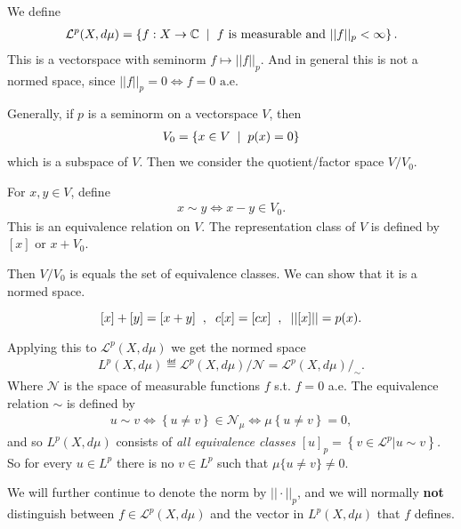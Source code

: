 \begin{definition}
    We define
    \begin{align*}
        \mathcal L^p(X,d\mu) = \left\{ f:X\rightarrow \mathbb{C}\hspace{2mm} |\hspace{2mm} f\text{ is measurable and } ||f||_p<\infty \right\}. 
    \end{align*}
    This is a vectorspace with seminorm $f\mapsto ||f||_p.$
     And in general this is not a normed space, since $||f||_p=0 \iff f=0 \text{ a.e.}$
\end{definition}

Generally, if $p$ is a seminorm on a vectorspace $V$, then
 \begin{align}
    V_0 = \left\{x\in V\hspace{2mm}|\hspace{2mm} p(x)=0 \right\}
\end{align}
which is a subspace of $V$. Then we consider the quotient/factor space $V/V_0.$

\begin{definition}
    For $x,y\in V$, define \begin{align}
        x\sim y \iff x-y\in V_0.
    \end{align}
    This is an equivalence relation on $V$. The representation class of $V$ is defined by $[x]$ or $x+V_0$.
\end{definition}

Then $V/V_0$ is equals the set of equivalence classes. We can show that it is a normed space. 

$$[x]+[y]=[x+y]\hspace{2mm},\hspace{2mm} c[x]=[cx]\hspace{2mm},\hspace{2mm} ||[x]||=p(x). $$

Applying this to $\mathcal L^p(X,d\mu)$ we get the normed space \begin{align}
    L^p(X,d\mu) \eqdef \mathcal L ^p(X,d\mu)/\mathcal N = \mathcal{L}^p(X,d\mu)/_{\sim}.
\end{align}
Where $\mathcal N$ is the space of measurable functions $f$ s.t. $f=0$ a.e. The equivalence relation \(\sim\) is defined by 
\begin{align*}
    u\sim v \Longleftrightarrow \left\{u\neq v\right\} \in \mathcal{N}_{\mu} \Longleftrightarrow \mu\left\{u\neq v\right\} = 0,
\end{align*}
and so \(L^p(X,d\mu)\) consists of \emph{all equivalence classes \([u]_p = \left\{v\in\mathcal{L}^p| u\sim v\right\}\).} So for every
\(u\in L^p\) there is no \(v\in L^p\) such that \(\mu\{u\neq v\} \neq 0\).

We will further continue to denote the norm by 
$||\cdot||_p$, and we will normally \textbf{not} distinguish between $f\in \mathcal L^p(X,d\mu)$ and the vector in 
$L^p(X,d\mu)$ that $f$ defines.

